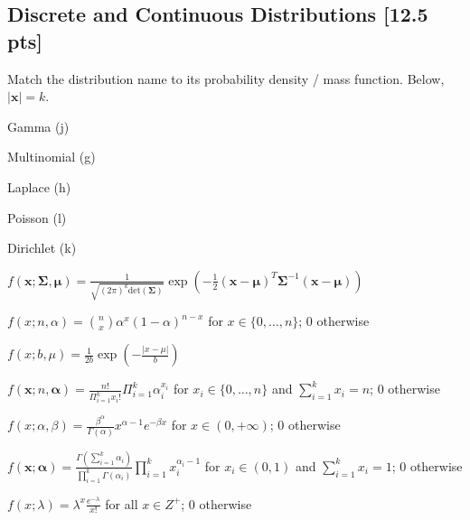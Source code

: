 \documentclass[a4paper]{article}
\theoremstyle{definition}
\newcommand{\vc}[1]{\boldsymbol{#1}}
\newcommand{\xv}{\vc{x}}
\newcommand{\Sigmav}{\vc{\Sigma}}
\newcommand{\alphav}{\vc{\alpha}}
\newcommand{\muv}{\vc{\mu}}
\newenvironment{soln}{
	\leavevmode\color{blue}\ignorespaces
}{}
\begin{document}
	\subsection{Discrete and Continuous Distributions [12.5 pts]}
	Match the distribution name to its probability density / mass
	function. Below, $|\xv| = k$.
	\begin{enumerate}[(a)]
		\begin{minipage}{0.3\linewidth}
			\item Gamma \begin{soln}  (j) \end{soln}
			\item Multinomial  \begin{soln}  (g) \end{soln}
			\item Laplace \begin{soln}  (h) \end{soln}
			\item Poisson \begin{soln}  (l) \end{soln}
			\item Dirichlet  \begin{soln}  (k) \end{soln}
			
		\end{minipage}
		\begin{minipage}{0.5\linewidth}
			\item $f(\xv; \Sigmav, \muv) = \frac{1}{\sqrt{(2\pi)^k \mathrm{det}(\Sigmav) }} \exp\left( -\frac{1}{2}
			(\xv - \muv)^T \Sigmav^{-1} (\xv - \muv)  \right)$
			\item $f(x; n, \alpha) = \binom{n}{x} \alpha^x (1 - \alpha)^{n-x}$
			for $x \in \{0,\ldots, n\}$; $0$ otherwise
			\item $f(x; b, \mu) = \frac{1}{2b} \exp\left( - \frac{|x - \mu|}{b} \right)$
			\item $f(\xv; n, \alphav) = \frac{n!}{\Pi_{i=1}^k x_i!}
			\Pi_{i=1}^k \alpha_i^{x_i}$ for $x_i \in \{0,\ldots,n\}$ and
			$\sum_{i=1}^k x_i = n$; $0$ otherwise
			\item $f(x; \alpha, \beta) = \frac{\beta^{\alpha}}{\Gamma(\alpha)} x^{\alpha -
				1}e^{-\beta x}$ for $x \in (0,+\infty)$; $0$ otherwise
			\item $f(\xv; \alphav) = \frac{\Gamma(\sum_{i=1}^k
				\alpha_i)}{\prod_{i=1}^k \Gamma(\alpha_i)} \prod_{i=1}^{k}
			x_i^{\alpha_i - 1}$ for $x_i \in (0,1)$ and $\sum_{i=1}^k x_i =
			1$; 0 otherwise
			\item $f(x; \lambda) = \lambda^x \frac{e^{-\lambda}}{x!}$ for all
			$x \in Z^+$; $0$ otherwise
		\end{minipage}
	\end{enumerate}
	
\end{document}
